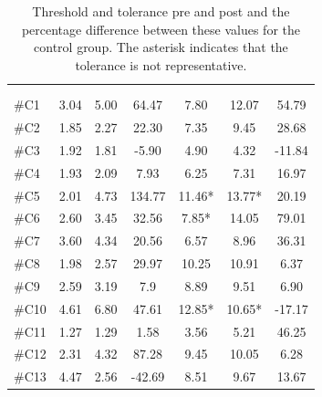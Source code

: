 \begin{longtable} {l|c|c|c|c|c|c}
	\caption{Threshold and tolerance pre and post and the percentage difference between these values for the control group. The asterisk indicates that the tolerance is not representative.}
	\label{tab:Control} \\
\cellcolor[HTML]{C0C0C0} {} & 
\multicolumn{3}{c|}{ \cellcolor[HTML]{C0C0C0}{\textbf{Threshold}}} & \multicolumn{3}{c}{ \cellcolor[HTML]{C0C0C0}{\textbf{Tolerance}}}  	\\  \rule{0pt}{3ex} 
  \cellcolor[HTML]{C0C0C0}{} &
 \multicolumn{1}{c|}{ \cellcolor[HTML]{C0C0C0}{Pre [KgF]}} & \multicolumn{1}{c|}{ \cellcolor[HTML]{C0C0C0}{Post [KgF]}} 
 & \multicolumn{1}{c}{ \cellcolor[HTML]{C0C0C0}{\textcolor[HTML]{C0C0C0}{0}Diff [\%]\textcolor[HTML]{C0C0C0}{0}}}
 & \multicolumn{1}{|c|}{ \cellcolor[HTML]{C0C0C0}{Pre [KgF]}} 
 & \multicolumn{1}{c|}{ \cellcolor[HTML]{C0C0C0}{Post [KgF]}} 
 & \multicolumn{1}{c}{ \cellcolor[HTML]{C0C0C0}{\textcolor[HTML]{C0C0C0}{0}Diff [\%]\textcolor[HTML]{C0C0C0}{0}}}  	\\ \hline   
\#C1 & 3.04	& 5.00	&	64.47	& 7.80	& 	12.07 &	54.79\\ \hline
\#C2 & 1.85 	& 2.27	&	22.30	& 7.35	& 	9.45 & 28.68	\\ \hline
\#C3 & 1.92 	& 1.81	&	-5.90	& 4.90	& 	4.32 & -11.84	\\ \hline
\#C4 & 1.93 	& 2.09	&	7.93		& 6.25	&	7.31 & 16.97	\\ \hline
\#C5 & 2.01 	& 4.73 	& 	134.77	& 11.46* 	& 13.77* & 20.19		\\ \hline
\#C6 & 2.60 	& 3.45	& 	32.56		& 7.85*	& 14.05 & 79.01		\\ \hline	
\#C7 & 3.60 & 4.34	& 	20.56		& 6.57 & 8.96  &	36.31 \\ \hline
\#C8 & 1.98 & 2.57	& 	29.97		& 10.25	& 10.91 &	6.37	\\ \hline
\#C9 & 2.59 & 3.19 	& 	7.9		& 8.89	& 9.51 & 6.90		\\ \hline
\#C10 & 4.61 & 6.80	& 	47.61		& 12.85*	& 10.65* & -17.17 \\ \hline
\#C11 & 1.27 & 1.29 	& 	1.58		& 3.56	& 5.21 &  46.25\\ \hline
\#C12 & 2.31 & 4.32 	& 	87.28	& 9.45 & 10.05 & 6.28 \\ \hline
\#C13 & 4.47 & 2.56 	& 	-42.69	& 8.51 & 9.67 & 13.67 \\ \hline

\end{longtable}
